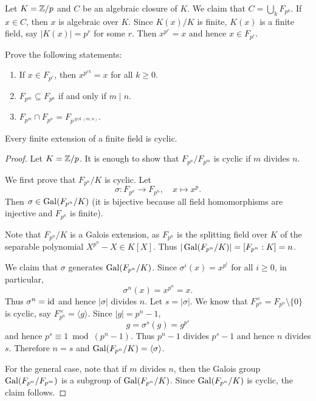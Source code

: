 Let $K=\mathbb{Z}/p$ and $C$ be an algebraic closure of $K$. 
We claim that $C=\bigcup_k F_{p^k}$. If $x\in C$, then $x$ is algebraic over $K$. 
Since $K(x)/K$ is finite, $K(x)$ is a finite field, say 
$|K(x)|=p^r$ for some $r$. Then $x^{p^r}=x$ and hence $x\in F_{p^r}$. 

\begin{exercise}
    Prove the following statements:
    \begin{enumerate}
        \item If $x\in F_{p^r}$, then $x^{p^{rk}}=x$ for all $k\geq0$.
        \item $F_{p^m}\subseteq F_{p^n}$ if and only if $m\mid n$. 
        \item $F_{p^m}\cap F_{p^n}=F_{p^{\gcd(m,n)}}$.
    \end{enumerate}
\end{exercise}

\begin{proposition}
    Every finite extension of a finite field is cyclic. 
\end{proposition}

\begin{proof}
    Let $K=\mathbb{Z}/p$. It is enough to show that $F_{p^n}/F_{p^m}$ is cyclic if $m$ divides $n$. 
    
    We first prove that $F_{p^n}/K$ is cyclic. 
    Let 
    \[
    \sigma\colon F_{p^n}\to F_{p^n},\quad 
    x\mapsto x^p.
    \]
    Then 
    $\sigma\in\operatorname{Gal}(F_{p^n}/K)$ (it is bijective because all field homomorphisms 
    are injective and $F_{p^n}$ is finite). 

    Note that 
    $F_{p^n}/K$ is a Galois extension, as $F_{p^n}$ is the splitting
    field over $K$ 
    of the separable polynomial $X^{p^n}-X\in K[X]$. 
    Thus $|\operatorname{Gal}(F_{p^n}/K)|=[F_{p^n}:K]=n$. 
    
    We claim that $\sigma$ generates $\operatorname{Gal}(F_{p^n}/K)$. Since 
    $\sigma^i(x)=x^{p^i}$ for all $i\geq 0$, in particular, 
    \[
    \sigma^n(x)=x^{p^n}=x.
    \]
    Thus $\sigma^n=\operatorname{id}$ and hence $|\sigma|$ divides $n$. Let 
    $s=|\sigma|$. We know that $F_{p^n}^{\times}=F_{p^n}\setminus\{0\}$ is
    cyclic, say $F_{p^n}^{\times}=\langle g\rangle$. Since $|g|=p^n-1$, 
    \[
    g=\sigma^s(g)=g^{p^s}
    \]
    and hence $p^s\equiv 1\bmod (p^n-1)$. Thus $p^n-1$ divides $p^s-1$ and
    hence $n$ divides $s$. Therefore $n=s$ and $\operatorname{Gal}(F_{p^n}/K)=\langle\sigma\rangle$. 
    
    For the general case, note that if $m$ divides $n$, 
    then the Galois group 
    $\operatorname{Gal}(F_{p^n}/F_{p^m})$ is a subgroup of $\operatorname{Gal}(F_{p^n}/K)$. Since  $\operatorname{Gal}(F_{p^n}/K)$ is cyclic, 
    the claim follows.
\end{proof}

